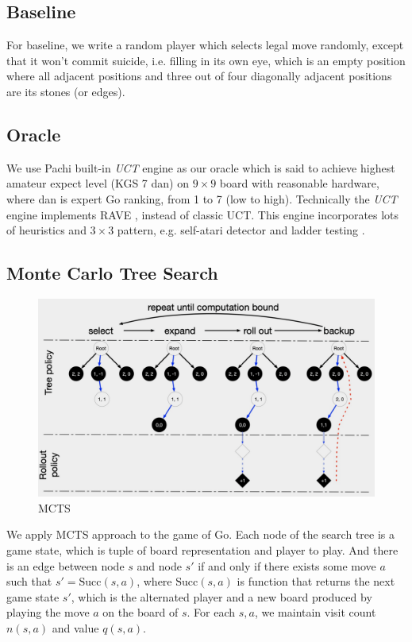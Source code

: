 \documentclass{article}
\begin{document}
\subsection{Baseline}
For baseline, we write a random player which selects legal move randomly, except that it won't commit suicide, i.e. filling in its own eye, which is an empty position where all adjacent positions and three out of four diagonally adjacent positions are its stones (or edges).

\subsection{Oracle}
We use Pachi built-in \textit{UCT} engine as our oracle which is said to achieve highest amateur expect level (KGS 7 dan) on $9 \times 9$ board with reasonable hardware, where dan is expert Go ranking, from 1 to 7 (low to high). Technically the \textit{UCT} engine implements RAVE \cite{gelly2007combining}, instead of classic UCT. This engine incorporates lots of heuristics and $3 \times 3$ pattern, e.g. self-atari detector and ladder testing \cite{baudivs2011pachi}.

\subsection{Monte Carlo Tree Search}
\label{sec:mcts}

\begin{figure}[H]
\centering
\includegraphics[width=0.5\linewidth]{mcts}
\caption{MCTS}
\label{fig:mcts}
\end{figure}

We apply MCTS approach to the game of Go. Each node of the search tree is a game state, which is tuple of board representation and player to play. And there is an edge between node $s$ and node $s'$ if and only if there exists some move $a$ such that $s' = \text{Succ}(s, a)$, where $\text{Succ}(s,a)$ is function that returns the next game state $s'$, which is the alternated player and a new board produced by playing the move $a$ on the board of $s$. For each  $s, a$, we maintain visit count $n(s,a)$ and value $q(s,a)$. 
\end{document}
